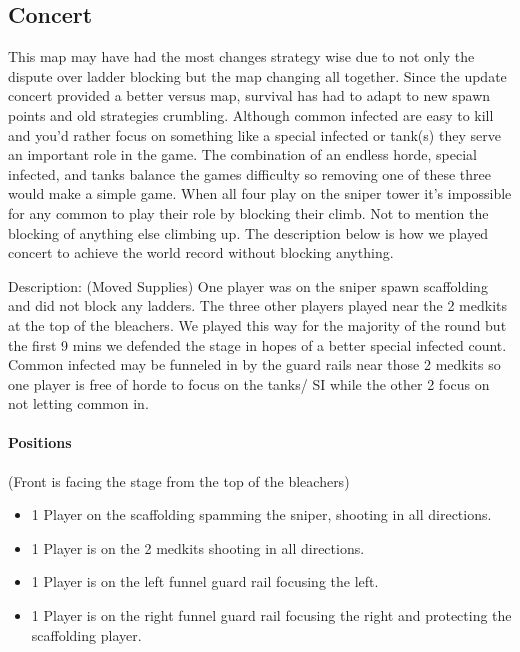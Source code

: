 \subsection{Concert}
This map may have had the most changes strategy wise due to not only the dispute over ladder blocking but the map changing all together. Since the update concert provided a better versus map, survival has had to adapt to new spawn points and old strategies crumbling. Although common infected are easy to kill and you'd rather focus on something like a special infected or tank(s) they serve an important role in the game. The combination of an endless horde, special infected, and tanks balance the games difficulty so removing one of these three would make a simple game. When all four play on the sniper tower it’s impossible for any common to play their role by blocking their climb. Not to mention the blocking of anything else climbing up. The description below is how we played concert to achieve the world record without blocking anything.

Description: (Moved Supplies)
One player was on the sniper spawn scaffolding and did not block any ladders. The three other players played near the 2 medkits at the top of the bleachers. We played this way for the majority of the round but the first 9 mins we defended the stage in hopes of a better special infected count. Common infected may be funneled in by the guard rails near those 2 medkits so one player is free of horde to focus on the tanks/ SI while the other 2 focus on not letting common in. 

\paragraph{Positions}
(Front is facing the stage from the top of the bleachers)
\begin{itemize}
\item 1 Player on the scaffolding spamming the sniper, shooting in all directions.
\item 1 Player is on the 2 medkits shooting in all directions.
\item 1 Player is on the left funnel guard rail focusing the left.
\item 1 Player is on the right funnel guard rail focusing the right and protecting the scaffolding player.
\end{itemize}

